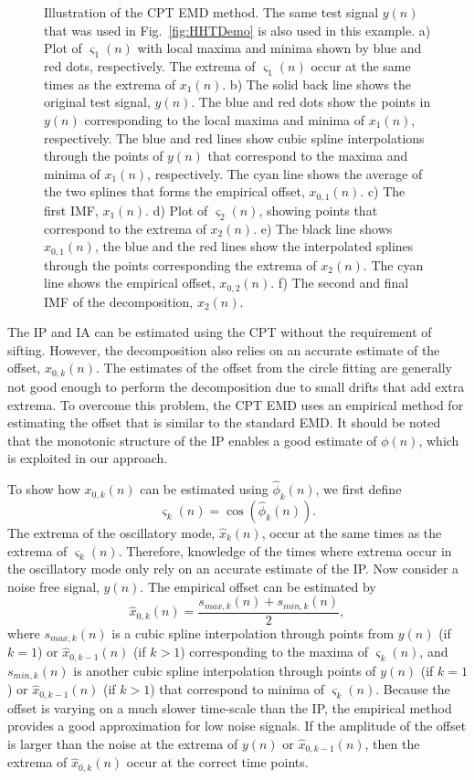 \documentclass[11pt,draftcls,onecolumn]{IEEEtran}
\begin{document}
\begin{figure}[ht]
	\caption{Illustration of the CPT EMD method. The same test signal $y(n)$ that was used in Fig.~\ref{fig:HHTDemo} is also used in this example. a) Plot of $\varsigma_1(n)$ with local maxima and minima shown by blue and red dots, respectively. The extrema of $\varsigma_1(n)$ occur at the same times as the extrema of $x_1(n)$. b) The solid back line shows the original test signal, $y(n)$. The blue and red dots show the points in $y(n)$ corresponding to the local maxima and minima of $x_1(n)$, respectively. The blue and red lines show cubic spline interpolations through the points of $y(n)$ that correspond to the maxima and minima of $x_1(n)$, respectively. The cyan line shows the average of the two splines that forms the empirical offset, $x_{0,1}(n)$. c) The first IMF, $x_1(n)$. d) Plot of $\varsigma_2(n)$, showing points that correspond to the extrema of $x_2(n)$. e) The black line shows $x_{0,1}(n)$, the blue and the red lines show the interpolated splines through the points corresponding the extrema of $x_2(n)$. The cyan line shows the empirical offset, $x_{0,2}(n)$. f) The second and final IMF of the decomposition, $x_2(n)$.}
	\label{fig:CPT_EMD}
\end{figure}

The IP and IA can be estimated using the CPT without the requirement of sifting. However, the decomposition also relies on an accurate estimate of the offset, $x_{0,k}(n)$. The estimates of the offset from the circle fitting are generally not good enough to perform the decomposition due to small drifts that add extra extrema. To overcome this problem, the CPT EMD uses an empirical method for estimating the offset that is similar to the standard EMD. It should be noted that the monotonic structure of the IP enables a good estimate of $\phi(n)$, which is exploited in our approach. 

To show how $x_{0,k}(n)$ can be estimated using $\hat\phi_k(n)$, we first define
\begin{equation}
	\varsigma_k(n)=\cos(\hat{\phi}_k(n)).
\end{equation}   
The extrema of the oscillatory mode, $\hat{x}_k(n)$, occur at the same times as the extrema of $\varsigma_k(n)$. Therefore, knowledge of the times where extrema occur in the oscillatory mode only rely on an accurate estimate of the IP. Now consider a noise free signal, $y(n)$. The empirical offset can be estimated by 
\begin{equation}
    \hat{x}_{0,k}(n) = \frac{s_{max,k}(n) + s_{min,k}(n)}{2},
\end{equation}
where $s_{max,k}(n)$ is a cubic spline interpolation through points from $y(n)$ (if $k=1$) or $\hat{x}_{0,k-1}(n)$ (if $k>1$) corresponding to the maxima of $\varsigma_k(n)$, and $s_{min,k}(n)$ is another cubic spline interpolation through points of $y(n)$ (if $k=1$) or $\hat{x}_{0,k-1}(n)$ (if $k>1$) that correspond to minima of $\varsigma_k(n)$. Because the offset is varying on a much slower time-scale than the IP, the empirical method provides a good approximation for low noise signals. If the amplitude of the offset is larger than the noise at the extrema of $y(n)$ or $\hat{x}_{0,k-1}(n)$, then the extrema of $\hat{x}_{0,k}(n)$ occur at the correct time points.
\end{document}
